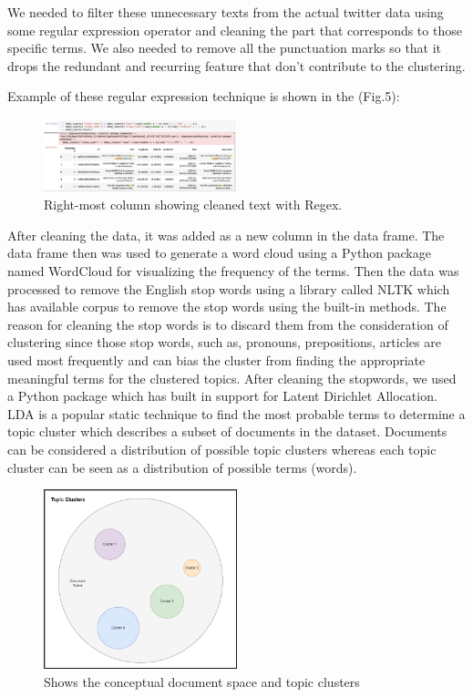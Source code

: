 We needed to filter these unnecessary texts from the actual twitter data using
some regular expression operator and cleaning the part that corresponds to
those specific terms. We also needed to remove all the punctuation marks so
that it drops the redundant and recurring feature that don't contribute to
the clustering.

Example of these regular expression technique is shown in the (Fig.5): 
\begin{figure}[H]
    \centering
    \includegraphics[width=0.5\textwidth]{imgs/cleaning_w_regex.png}
    \caption{Right-most column showing cleaned text with Regex.}
    \label{fig:regex}
\end{figure}
After cleaning the data, it was added as a new column in the data frame. The
data frame then was used to generate a word cloud using a Python package
named WordCloud for visualizing the frequency of the terms. Then the data was
processed to remove the English stop words using a library called NLTK which
has available corpus to remove the stop words using the built-in methods. The
reason for cleaning the stop words is to discard them from the consideration
of clustering since those stop words, such as, pronouns, prepositions,
articles are used most frequently and can bias the cluster from finding the
appropriate meaningful terms for the clustered topics. After cleaning the
stopwords, we used a Python package which has built in support for Latent
Dirichlet Allocation. LDA is a popular static technique to find the most
probable terms to determine a topic cluster which describes a subset of
documents in the dataset. Documents can be considered a distribution of
possible topic clusters whereas each topic cluster can be seen as a
distribution of possible terms (words).
\begin{figure}[h]
\centering
\includegraphics[width=0.5\textwidth]{imgs/topic_clusters.png}
\caption{\label{fig:Research process} Shows the conceptual document space and topic clusters}
\end{figure}
